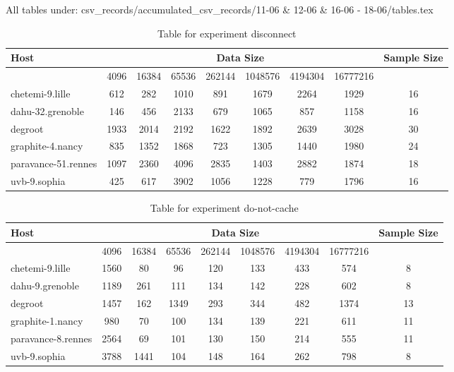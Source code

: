 All tables under: csv_records/accumulated_csv_records/11-06 & 12-06 & 16-06 - 18-06/tables.tex
\begin{table}
\caption{Table for experiment disconnect}
\begin{tabular}{@{}lcccccccc@{}}
\toprule
Host    & \multicolumn{7}{c}{Data Size}          & Sample Size \\ \midrule
& 4096  & 16384  & 65536  & 262144  & 1048576  & 4194304  & 16777216              \\ \midrule
chetemi-9.lille  & 612  & 282  & 1010  & 891  & 1679  & 2264  & 1929  & 16 \\
dahu-32.grenoble  & 146  & 456  & 2133  & 679  & 1065  & 857  & 1158  & 16 \\
degroot  & 1933  & 2014  & 2192  & 1622  & 1892  & 2639  & 3028  & 30 \\
graphite-4.nancy  & 835  & 1352  & 1868  & 723  & 1305  & 1440  & 1980  & 24 \\
paravance-51.rennes  & 1097  & 2360  & 4096  & 2835  & 1403  & 2882  & 1874  & 18 \\
uvb-9.sophia  & 425  & 617  & 3902  & 1056  & 1228  & 779  & 1796  & 16 \\
\bottomrule
\end{tabular}
\end{table}

\begin{table}
\caption{Table for experiment do-not-cache}
\begin{tabular}{@{}lcccccccc@{}}
\toprule
Host    & \multicolumn{7}{c}{Data Size}          & Sample Size \\ \midrule
& 4096  & 16384  & 65536  & 262144  & 1048576  & 4194304  & 16777216              \\ \midrule
chetemi-9.lille  & 1560  & 80  & 96  & 120  & 133  & 433  & 574  & 8 \\
dahu-9.grenoble  & 1189  & 261  & 111  & 134  & 142  & 228  & 602  & 8 \\
degroot  & 1457  & 162  & 1349  & 293  & 344  & 482  & 1374  & 13 \\
graphite-1.nancy  & 980  & 70  & 100  & 134  & 139  & 221  & 611  & 11 \\
paravance-8.rennes  & 2564  & 69  & 101  & 130  & 150  & 214  & 555  & 11 \\
uvb-9.sophia  & 3788  & 1441  & 104  & 148  & 164  & 262  & 798  & 8 \\
\bottomrule
\end{tabular}
\end{table}

